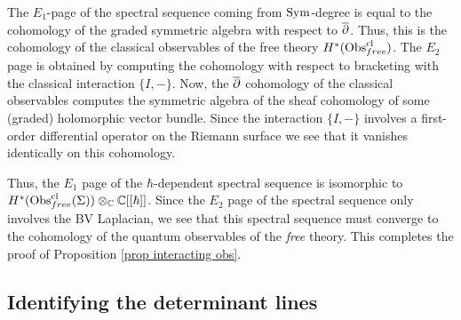 The $E_1$-page of the spectral sequence coming from ${\rm Sym}$-degree is equal to the cohomology of the graded symmetric algebra with respect to $\overline{\partial}$. 
Thus, this is the cohomology of the classical observables of the free theory $H^*({\rm Obs}^{{\rm cl}}_{free})$. 
The $E_2$ page is obtained by computing the cohomology with respect to bracketing with the classical interaction $\{I,-\}$. 
Now, the $\overline{\partial}$ cohomology of the classical observables computes the symmetric algebra of the sheaf cohomology of some (graded) holomorphic vector bundle.
Since the interaction $\{I,-\}$ involves a first-order differential operator on the Riemann surface we see that it vanishes identically on this cohomology. 

Thus, the $E_1$ page of the $\hbar$-dependent spectral sequence is isomorphic to $H^*({\rm Obs}^{{\rm cl}}_{free}(\Sigma)) \otimes_\mathbb C \mathbb C[[\hbar]]$. 
Since the $E_2$ page of the spectral sequence only involves the BV Laplacian, we see that this spectral sequence must converge to the cohomology of the quantum observables of the {\em free} theory. 
This completes the proof of Proposition \ref{prop interacting obs}.


\subsection{Identifying the determinant lines}

